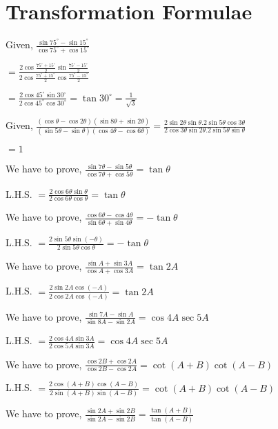 \chapter{Transformation Formulae}
\startitemize[n, 1*broad]
\item Given, $\frac{\sin 75^\circ - \sin 15^\circ}{\cos 75^\circ + \cos 15^\circ}$

  $= \frac{2\cos \frac{75^\circ + 15^\circ}{2}\sin \frac{75^\circ - 15^\circ}{2}}{2\cos \frac{75^\circ + 15^\circ}{2}\cos
  \frac{75^\circ - 15^\circ}{2}}$

  $= \frac{2\cos 45^\circ\sin30^\circ}{2\cos45^\circ\cos30^\circ} = \tan30^\circ = \frac{1}{\sqrt{3}}$

\item Given, $\frac{(\cos \theta - \cos 2\theta)(\sin 8\theta + \sin 2\theta)}{(\sin 5\theta - \sin\theta)(\cos
  4\theta - \cos 6\theta)} = \frac{2\sin2\theta\sin\theta.2\sin5\theta\cos3\theta}{2\cos3\theta\sin2\theta.2\sin5\theta\sin\theta}$

  $= 1$

\item We have to prove, $\frac{\sin7\theta - \sin5\theta}{\cos7\theta + \cos5\theta} = \tan\theta$

  L.H.S. $= \frac{2\cos6\theta\sin\theta}{2\cos6\theta\cos\theta} = \tan\theta$

\item We have to prove, $\frac{\cos6\theta - \cos4\theta}{\sin6\theta + \sin4\theta} = -\tan\theta$

  L.H.S. $= \frac{2\sin5\theta\sin(-\theta)}{2\sin5\theta\cos\theta} = -\tan\theta$

\item We have to prove, $\frac{\sin A + \sin 3A}{\cos A + \cos 3A} = \tan 2A$

  L.H.S. $= \frac{2\sin2A\cos(-A)}{2\cos2A\cos(-A)} = \tan 2A$

\item We have to prove, $\frac{\sin 7A - \sin A}{\sin 8A - \sin 2A} = \cos 4A\sec 5A$

  L.H.S. $= \frac{2\cos4A\sin3A}{2\cos5A\sin3A} = \cos4A\sec5A$

\item We have to prove, $\frac{\cos 2B + \cos 2A}{\cos 2B - \cos 2A} = \cot(A + B)\cot(A - B)$

  L.H.S. $= \frac{2\cos(A + B)\cos(A - B)}{2\sin(A + B)\sin(A - B)} = \cot(A + B)\cot(A - B)$

\item We have to prove, $\frac{\sin 2A + \sin 2B}{\sin 2A - \sin 2B} = \frac{\tan(A + B)}{\tan(A - B)}$

